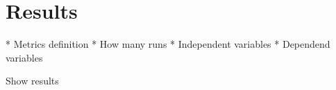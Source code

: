 \section{Results}

* Metrics definition
* How many runs
  * Independent variables
  * Dependend variables
  
Show results
